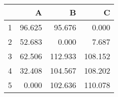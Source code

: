 \begin{tabular}{rrrr}
\toprule
     &      A &       B &       C \\
\midrule
   1 & \num{96.625} &  \num{95.676} &   \num{0.000} \\
   2 & \num{52.683} &   \num{0.000} &   \num{7.687} \\
   3 & \num{62.506} & \num{112.933} & \num{108.152} \\
   4 & \num{32.408} & \num{104.567} & \num{108.202} \\
   5 &  \num{0.000} & \num{102.636} & \num{110.078} \\
\bottomrule
\end{tabular}